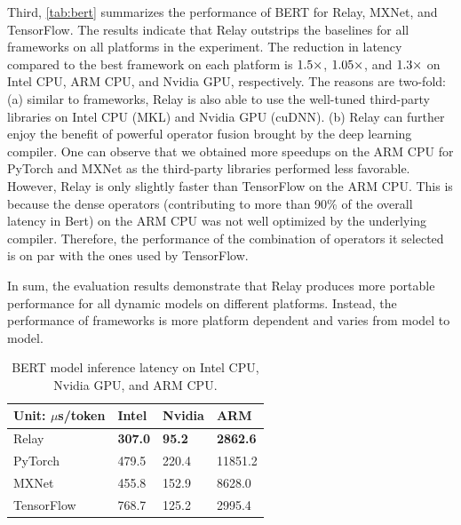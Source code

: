     Third, \autoref{tab:bert} summarizes the performance of BERT for Relay, MXNet, and TensorFlow. The results indicate that Relay outstrips the baselines for all frameworks on all platforms in the experiment. The reduction in latency compared to the best framework on each platform is $\fpeval{round(455.8/307, 1)}\times$, $\fpeval{round(2995.4/2862.6, 2)}\times$, and $\fpeval{round(125.2/95.2, 1)}\times$ on Intel CPU, ARM CPU, and Nvidia GPU, respectively.
    The reasons are two-fold: (a) similar to frameworks, Relay is also able to use the well-tuned third-party libraries on Intel CPU (MKL) and Nvidia GPU (cuDNN). (b) Relay can further enjoy the benefit of powerful operator fusion brought by the deep learning compiler. One can observe that we obtained more speedups on the ARM CPU for PyTorch and MXNet as the third-party libraries performed less favorable. However, Relay is only slightly faster than TensorFlow on the ARM CPU. This is because the dense operators (contributing to more than 90\% of the overall latency in Bert) on the ARM CPU was not well optimized by the underlying compiler. Therefore, the performance of the combination of operators it selected is on par with the ones used by TensorFlow.

    In sum, the evaluation results demonstrate that Relay produces more portable performance for all dynamic models on different platforms. Instead, the performance of frameworks is more platform dependent and varies from model to model.

    \begin{table}[t]
    \centering
    \begin{tabular}{l|lll}
    \toprule
    Unit: $\mu$s/token    & Intel  &   Nvidia       &  ARM     \\ \midrule
    Relay     & \bf{307.0} & \bf{95.2} & \bf{2862.6} \\
    PyTorch & 479.5 & 220.4 & 11851.2 \\
    MXNet      & 455.8 & 152.9 & 8628.0   \\
    TensorFlow & 768.7 & 125.2 & 2995.4 \\
    \bottomrule
    \end{tabular}
    \caption{BERT model inference latency on Intel CPU, Nvidia GPU, and ARM CPU.}
    \label{tab:bert}
    \end{table}

